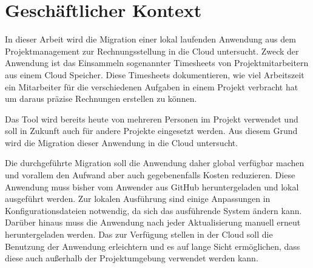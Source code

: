 \section{Geschäftlicher Kontext}


In dieser Arbeit wird die Migration einer lokal laufenden Anwendung aus dem Projektmanagement zur Rechnungsstellung in die Cloud untersucht.
Zweck der Anwendung ist das Einsammeln sogenannter Timesheets von Projektmitarbeitern aus einem Cloud Speicher. Diese Timesheets dokumentieren,
wie viel Arbeitszeit ein Mitarbeiter für die verschiedenen Aufgaben in einem Projekt verbracht hat um daraus präzise Rechnungen erstellen zu können.

Das Tool wird bereits heute von mehreren Personen im Projekt verwendet und soll in Zukunft auch für andere Projekte eingesetzt werden. Aus diesem
Grund wird die Migration dieser Anwendung in die Cloud untersucht.

Die durchgeführte Migration soll die Anwendung daher global verfügbar machen und vorallem den Aufwand aber auch gegebenenfalls Kosten reduzieren.
Diese Anwendung muss bisher vom Anwender aus GitHub heruntergeladen und lokal ausgeführt werden.
Zur lokalen Ausführung sind einige Anpassungen in Konfigurationsdateien notwendig, da sich das ausführende System ändern kann.
Darüber hinaus muss die Anwendung nach jeder Aktualisierung manuell erneut heruntergeladen werden.
Das zur Verfügung stellen in der Cloud soll die Benutzung der Anwendung erleichtern und es auf lange Sicht ermöglichen, dass diese auch außerhalb der Projektumgebung verwendet werden kann.